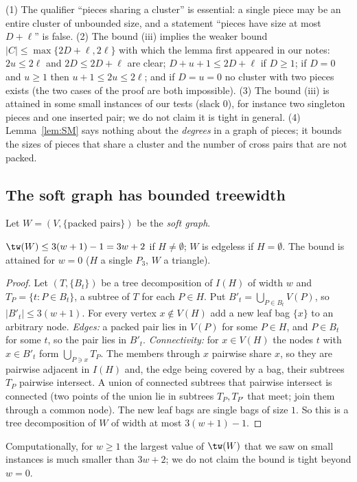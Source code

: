 \begin{remark}\label{rem:SMqual}
(1) The qualifier ``pieces sharing a cluster'' is essential: a single piece may be an entire cluster of unbounded size, and a statement ``pieces have size at most $D+\ell$'' is false. (2) The bound (iii) implies the weaker bound $|C|\le\max\{2D+\ell,2\ell\}$ with which the lemma first appeared in our notes: $2u\le2\ell$ and $2D\le2D+\ell$ are clear; $D+u+1\le2D+\ell$ if $D\ge1$; if $D=0$ and $u\ge1$ then $u+1\le2u\le2\ell$; and if $D=u=0$ no cluster with two pieces exists (the two cases of the proof are both impossible). (3) The bound (iii) is attained in some small instances of our tests (slack $0$), for instance two singleton pieces and one inserted pair; we do not claim it is tight in general. (4) Lemma~\ref{lem:SM} says nothing about the \emph{degrees} in a graph of pieces; it bounds the sizes of pieces that share a cluster and the number of cross pairs that are not packed.
\end{remark}

\subsection{The soft graph has bounded treewidth}
Let $W=(V,\{\text{packed pairs}\})$ be the \emph{soft graph}.
\begin{proposition}\label{prop:soft}
$\tw(W)\le 3(w+1)-1=3w+2$ if $H\ne\emptyset$; $W$ is edgeless if $H=\emptyset$. The bound is attained for $w=0$ ($H$ a single $P_3$, $W$ a triangle).
\end{proposition}
\begin{proof}
Let $(T,\{B_t\})$ be a tree decomposition of $I(H)$ of width $w$ and $T_P=\{t:P\in B_t\}$, a subtree of $T$ for each $P\in H$. Put $B'_t=\bigcup_{P\in B_t}V(P)$, so $|B'_t|\le3(w+1)$. For every vertex $x\notin V(H)$ add a new leaf bag $\{x\}$ to an arbitrary node. \emph{Edges:} a packed pair lies in $V(P)$ for some $P\in H$, and $P\in B_t$ for some $t$, so the pair lies in $B'_t$. \emph{Connectivity:} for $x\in V(H)$ the nodes $t$ with $x\in B'_t$ form $\bigcup_{P\ni x}T_P$. The members through $x$ pairwise share $x$, so they are pairwise adjacent in $I(H)$ and, the edge being covered by a bag, their subtrees $T_P$ pairwise intersect. A union of connected subtrees that pairwise intersect is connected (two points of the union lie in subtrees $T_P,T_{P'}$ that meet; join them through a common node). The new leaf bags are single bags of size $1$. So this is a tree decomposition of $W$ of width at most $3(w+1)-1$.
\end{proof}
Computationally, for $w\ge1$ the largest value of $\tw(W)$ that we saw on small instances is much smaller than $3w+2$; we do not claim the bound is tight beyond $w=0$.

